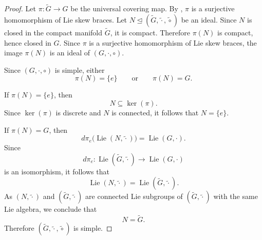 \documentclass[reqno]{amsart}
\DeclareMathOperator{\Lie}{Lie}
\begin{document}
\begin{proof}
Let
$\pi:\widetilde G\to G$
be the universal covering map. By \cite[Lemma~3.2]{DameleLoi2026}, $\pi$ is a
surjective homomorphism of Lie skew braces.
Let
$N\trianglelefteq (\widetilde G,\widetilde\cdot,\widetilde\circ)$
be an ideal. Since $N$ is closed in the compact manifold $\widetilde G$, it is
compact. Therefore $\pi(N)$ is compact, hence closed in $G$. Since $\pi$ is a
surjective homomorphism of Lie skew braces, the image $\pi(N)$ is an ideal of
$(G,\cdot,\circ)$.

Since $(G,\cdot,\circ)$ is simple, either
\[
\pi(N)=\{e\}
\qquad\text{or}\qquad
\pi(N)=G.
\]

If $\pi(N)=\{e\}$, then
\[
N\subseteq \ker(\pi).
\]
Since $\ker(\pi)$ is discrete and $N$ is connected, it follows that
$N=\{e\}$.

If $\pi(N)=G$, then
\[
d\pi_e\bigl(\Lie(N,\widetilde\cdot)\bigr)=\Lie(G,\cdot).
\]
Since
\[
d\pi_e:\Lie(\widetilde G,\widetilde\cdot)\to \Lie(G,\cdot)
\]
is an isomorphism, it follows that
\[
\Lie(N,\widetilde\cdot)=\Lie(\widetilde G,\widetilde\cdot).
\]
As $(N,\widetilde\cdot)$ and $(\widetilde G,\widetilde\cdot)$ are connected Lie
subgroups of $(\widetilde G,\widetilde\cdot)$ with the same Lie algebra, we
conclude that
\[
N=\widetilde G.
\]
Therefore $(\widetilde G,\widetilde\cdot,\widetilde\circ)$ is simple.
\end{proof}
\end{document}
